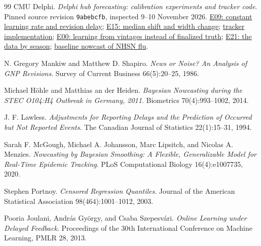 \documentclass[11pt,a4paper]{article}
\theoremstyle{definition}
\theoremstyle{remark}
\begin{document}
\begin{thebibliography}{99}
CMU Delphi.
\emph{Delphi hub forecasting: calibration experiments and tracker code}.
Pinned source revision \texttt{9abebcfb}, inspected 9--10 November 2026.
\href{https://github.com/cmu-delphi/delphi-hub-forecasting/blob/9abebcfb/reports/writeups/calibration_experiments/e09_lr_delay.Rmd}{E09: constant learning rate and revision delay};
\href{https://github.com/cmu-delphi/delphi-hub-forecasting/blob/9abebcfb/reports/writeups/calibration_experiments/e15_wis_sources.Rmd}{E15: median shift and width change};
\href{https://github.com/cmu-delphi/delphi-hub-forecasting/blob/9abebcfb/R/calibration/qt.R}{tracker implementation};
\href{https://github.com/cmu-delphi/delphi-hub-forecasting/blob/9abebcfb/reports/writeups/calibration_experiments/e00_vintage_backtest.Rmd}{E00: learning from vintages instead of finalized truth};
\href{https://github.com/cmu-delphi/delphi-hub-forecasting/blob/9abebcfb/reports/writeups/calibration_experiments/e21_data_by_season.Rmd}{E21: the data by season};
\href{https://github.com/cmu-delphi/delphi-hub-forecasting/blob/9abebcfb/reports/writeups/nowcasting/baseline_nowcast_flu_nhsn.qmd}{baseline nowcast of NHSN flu}.

N. Gregory Mankiw and Matthew D. Shapiro.
\emph{News or Noise? An Analysis of GNP Revisions}.
Survey of Current Business 66(5):20--25, 1986.

Michael H\"ohle and Matthias an der Heiden.
\emph{Bayesian Nowcasting during the STEC O104:H4 Outbreak in Germany, 2011}.
Biometrics 70(4):993--1002, 2014.

J. F. Lawless.
\emph{Adjustments for Reporting Delays and the Prediction of Occurred but
Not Reported Events}.
The Canadian Journal of Statistics 22(1):15--31, 1994.

Sarah F. McGough, Michael A. Johansson, Marc Lipsitch, and Nicolas A. Menzies.
\emph{Nowcasting by Bayesian Smoothing: A Flexible, Generalizable Model for
Real-Time Epidemic Tracking}.
PLoS Computational Biology 16(4):e1007735, 2020.

Stephen Portnoy.
\emph{Censored Regression Quantiles}.
Journal of the American Statistical Association 98(464):1001--1012, 2003.

Pooria Joulani, Andr\'as Gy\"orgy, and Csaba Szepesv\'ari.
\emph{Online Learning under Delayed Feedback}.
Proceedings of the 30th International Conference on Machine Learning,
PMLR 28, 2013.


\end{thebibliography}
\end{document}
